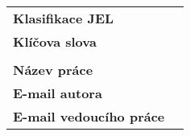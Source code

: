 \bigskip

\begin{tabular}{lp{7.7cm}}
		\textbf{Klasifikace JEL} & \JEL \\
		\textbf{Klíčova slova} & \Klic \\
 		& \\
		\textbf{Název práce} & \BooknameCZ \\
 		\textbf{E-mail autora} & \texttt{\href{mailto:\Email}{\Email}}\\
		\textbf{E-mail vedoucího práce} & \texttt{\href{mailto:\EmailSup}{\EmailSup}}\\
\end{tabular}

